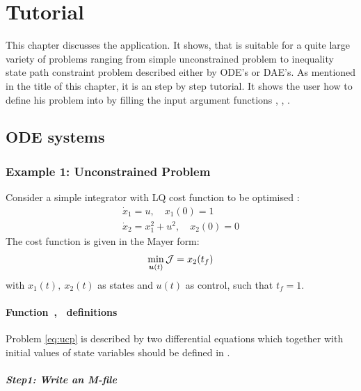 \chapter{Tutorial}
\label{cha:tutorial}

This chapter discusses the  application. It shows, that
 is suitable for a quite large variety of problems
ranging from simple unconstrained problem to inequality state path
constraint problem described either by ODE's or DAE's. As mentioned in
the title of this chapter, it is an step by step tutorial. It shows
the user how to define his problem into  by filling the
input argument functions , , . 

\section{ODE systems}
\label{sec:odes}

\subsection{Example 1: Unconstrained Problem}
\label{sec:unconprob}

Consider a simple integrator with LQ cost function to be
optimised \citep{luu91,raj01}: 
\begin{gather}
\dot{x}_1 = u, \quad x_{1}(0) = 1\\
\dot{x}_2 = x^{2}_{1} + u^{2}, \quad x_{2}(0) = 0
\end{gather}
The cost function is given in the Mayer form:
\begin{equation}
\min_{\ve{u}(t)} \mf{J} = x_{2}(t_{f}) \label{eq:ucp} 
\end{equation} with $x_{1}(t),~x_{2}(t)$ as states and $u(t)$ as
control, such that $t_{f} = 1$.

\subsubsection{Function~,~  definitions}
\label{sec:unconprob-fundef}

Problem \eqref{eq:ucp} is described by two differential equations
which together with initial values of state variables should be
defined in .

\paragraph{Step1: Write an M-file~}

